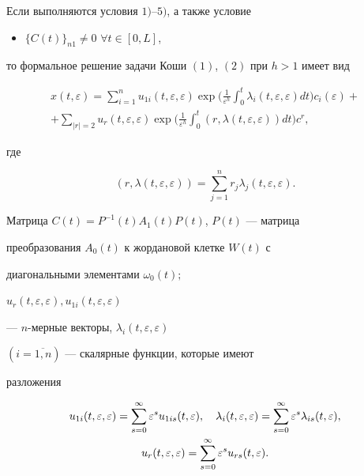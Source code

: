\begin{thm}


Если выполняются условия $1)$--$5)$, а также условие


\begin{itemize}


\item[6)] $\{C(t)\}_{n1}\neq 0$ $\forall t \in [0,L]$,


\end{itemize}


то формальное решение задачи Коши $(1)$, $(2)$ при $h>1$ имеет вид


\begin{multline}


x(t,\varepsilon)=\sum_{i=1}^{n}u_{1i}(t,\varepsilon,\varepsilon)


\exp\bigg(\frac{1}{\varepsilon^{h}}


\int_{0}^{t}\lambda_{i}(t,\varepsilon,\varepsilon)dt\bigg)c_{i}(\varepsilon)+\\


%


+\sum_{|r|=2} u_{r}


(t,\varepsilon,\varepsilon)\exp\bigg(\frac{1}{\varepsilon^{h}}


\int_{0}^{t}(r,\lambda(t,\varepsilon,\varepsilon))dt\bigg)c^{r},


\end{multline}


где


$$


(r,\lambda(t,\varepsilon,\varepsilon))=\sum\limits_{j=1}^{n}r_{j}\lambda_{j}


(t,\varepsilon,\varepsilon).


$$


Матрица $C(t)=P^{-1}(t)A_{1}(t)P(t)$, $P(t)$ --- матрица


преобразования $A_{0}(t)$ к жордановой клетке $W(t)$ с


диагональными элементами $\omega_{0}(t);$


$u_{r}(t,\varepsilon,\varepsilon),u_{1i}(t,\varepsilon,\varepsilon)$


--- $n$-мерные векторы, $\lambda_{i}(t,\varepsilon,\varepsilon)$


$(i=\overline{1,n})$ --- скалярные функции, которые имеют


разложения


\begin{gather}


u_{1i}(t,\varepsilon,\varepsilon)=\sum_{s=0}^{\infty}


\varepsilon^{s}u_{1is}(t,\varepsilon),\quad


\lambda_{i}(t,\varepsilon,\varepsilon)=\sum_{s=0}^{\infty}\varepsilon^{s}


\lambda_{is}(t,\varepsilon),\\


u_{r}(t,\varepsilon,\varepsilon)=\sum_{s=0}^{\infty}\varepsilon^{s}u_{rs}


(t,\varepsilon).\notag


\end{gather}


\end{thm}
